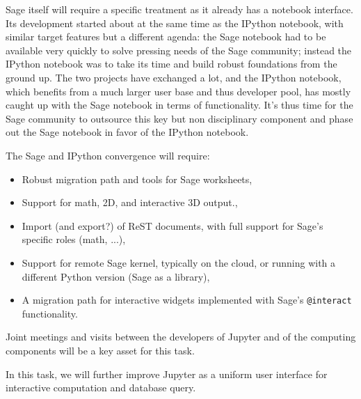 \begin{workpackage}
\begin{tasklist}
\begin{task}[title=Uniform notebook interface for all interactive components,id=ipython_kernels]

  Sage itself will require a specific treatment as it already has a
  notebook interface. Its development started about at the same time
  as the IPython notebook, with similar target features but a
  different agenda: the Sage notebook had to be available very quickly
  to solve pressing needs of the Sage community; instead the IPython
  notebook was to take its time and build robust foundations from the
  ground up. The two projects have exchanged a lot, and the IPython
  notebook, which benefits from a much larger user base and thus
  developer pool, has mostly caught up with the Sage notebook in terms
  of functionality. It's thus time for the Sage community to outsource
  this key but non disciplinary component and phase out the Sage
  notebook in favor of the IPython notebook.

  The Sage and IPython convergence  will
  require:
  \begin{itemize}
  \item Robust migration path and tools for Sage worksheets,
  \item Support for math, 2D, and interactive 3D output.,
  \item Import (and export?) of ReST documents, with full support for
    Sage's specific roles (math, ...),
  \item Support for remote Sage kernel, typically on the cloud, or
    running with a different Python version (Sage as a library),
  \item A migration path for interactive widgets implemented with
    Sage's \texttt{@interact} functionality.
  \end{itemize}

  Joint meetings and visits between the developers of Jupyter and of
  the computing components will be a key asset for this task.

\end{task}

\begin{task}[title=Notebook interface usability]
  In this task, we will further improve Jupyter as a uniform user
  interface for interactive computation and database query.


\end{task}
\end{tasklist}
\end{workpackage}
